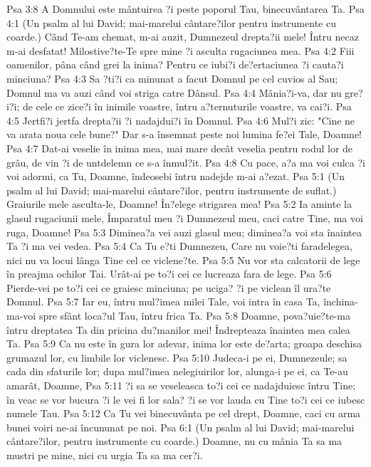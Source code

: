 Psa 3:8  A Domnului este mântuirea ?i peste poporul Tau, binecuvântarea Ta.
Psa 4:1  (Un psalm al lui David; mai-marelui cântare?ilor pentru instrumente cu coarde.) Când Te-am chemat, m-ai auzit, Dumnezeul drepta?ii mele! Întru necaz m-ai desfatat! Milostive?te-Te spre mine ?i asculta rugaciunea mea.
Psa 4:2  Fiii oamenilor, pâna când grei la inima? Pentru ce iubi?i de?ertaciunea ?i cauta?i minciuna?
Psa 4:3  Sa ?ti?i ca minunat a facut Domnul pe cel cuvios al Sau; Domnul ma va auzi când voi striga catre Dânsul.
Psa 4:4  Mânia?i-va, dar nu gre?i?i; de cele ce zice?i în inimile voastre, întru a?ternuturile voastre, va cai?i.
Psa 4:5  Jertfi?i jertfa drepta?ii ?i nadajdui?i în Domnul.
Psa 4:6  Mul?i zic: "Cine ne va arata noua cele bune?" Dar s-a însemnat peste noi lumina fe?ei Tale, Doamne!
Psa 4:7  Dat-ai veselie în inima mea, mai mare decât veselia pentru rodul lor de grâu, de vin ?i de untdelemn ce s-a înmul?it.
Psa 4:8  Cu pace, a?a ma voi culca ?i voi adormi, ca Tu, Doamne, îndeosebi întru nadejde m-ai a?ezat.
Psa 5:1  (Un psalm al lui David; mai-marelui cântare?ilor, pentru instrumente de suflat.) Graiurile mele asculta-le, Doamne! În?elege strigarea mea!
Psa 5:2  Ia aminte la glasul rugaciunii mele, Împaratul meu ?i Dumnezeul meu, caci catre Tine, ma voi ruga, Doamne!
Psa 5:3  Diminea?a vei auzi glasul meu; diminea?a voi sta înaintea Ta ?i ma vei vedea.
Psa 5:4  Ca Tu e?ti Dumnezeu, Care nu voie?ti faradelegea, nici nu va locui lânga Tine cel ce viclene?te.
Psa 5:5  Nu vor sta calcatorii de lege în preajma ochilor Tai. Urât-ai pe to?i cei ce lucreaza fara de lege.
Psa 5:6  Pierde-vei pe to?i cei ce graiesc minciuna; pe uciga? ?i pe viclean îl ura?te Domnul.
Psa 5:7  Iar eu, întru mul?imea milei Tale, voi intra în casa Ta, închina-ma-voi spre sfânt loca?ul Tau, întru frica Ta.
Psa 5:8  Doamne, pova?uie?te-ma întru dreptatea Ta din pricina du?manilor mei! Îndrepteaza înaintea mea calea Ta.
Psa 5:9  Ca nu este în gura lor adevar, inima lor este de?arta; groapa deschisa grumazul lor, cu limbile lor viclenesc.
Psa 5:10  Judeca-i pe ei, Dumnezeule; sa cada din sfaturile lor; dupa mul?imea nelegiuirilor lor, alunga-i pe ei, ca Te-au amarât, Doamne,
Psa 5:11  ?i sa se veseleasca to?i cei ce nadajduiesc întru Tine; în veac se vor bucura ?i le vei fi lor sala? ?i se vor lauda cu Tine to?i cei ce iubesc numele Tau.
Psa 5:12  Ca Tu vei binecuvânta pe cel drept, Doamne, caci cu arma bunei voiri ne-ai încununat pe noi.
Psa 6:1  (Un psalm al lui David; mai-marelui cântare?ilor, pentru instrumente cu coarde.) Doamne, nu cu mânia Ta sa ma mustri pe mine, nici cu urgia Ta sa ma cer?i.
